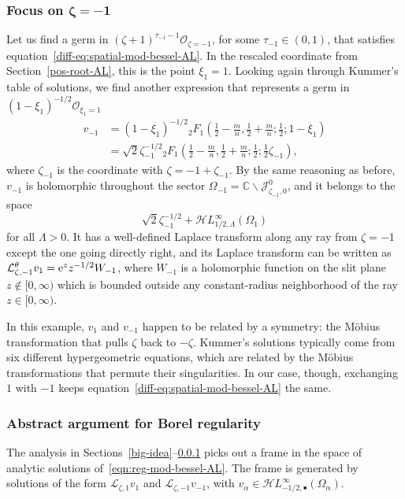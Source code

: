 \documentclass[10pt,a4paper]{amsart}
\newcommand{\singexp}[2]{\mathcal{H}L^\infty_{#1, #2}}
\newcommand{\singexpalg}[1]{\singexp{#1}{\bullet}}
\newcommand{\C}{\mathbb{C}}
\newcommand{\laplace}{\mathcal{L}}
\numberwithin{equation}{section}
\begin{document}
\subsubsection[Focus on zeta = -1]{Focus on $\boldsymbol{\zeta = -1}$}\label{neg-root-AL}
%
Let us find a germ in $(\zeta+1)^{\tau_{-1}-1} \mathcal{O}_{\zeta=-1}$, for some $\tau_{-1} \in (0, 1)$, that satisfies equation~\eqref{diff-eq:spatial-mod-bessel-AL}. In the rescaled coordinate from Section~\ref{pos-root-AL}, this is the point $\xi_1 = 1$. Looking again through Kummer's table of solutions, we find another expression \cite[formula~(15.10.14)]{dlmf} that represents a germ in $(1-\xi_1)^{-1/2} \mathcal{O}_{\xi_1=1}$
\begin{align*}
v_{-1}& = (1-\xi_1)^{-1/2} {}_2F_1\left(\frac{1}{2}-\frac{m}{n}, \frac{1}{2}+\frac{m}{n}; \frac{1}{2}; 1-\xi_1\right)\\
&= \sqrt{2} \zeta_{-1}^{-1/2} {}_2F_1\left(\frac{1}{2}-\frac{m}{n}, \frac{1}{2}+\frac{m}{n}; \frac{1}{2}; \frac{1}{2}\zeta_{-1}\right),
\end{align*}
where $\zeta_{-1}$ is the coordinate with $\zeta = -1 + \zeta_{-1}$. By the same reasoning as before, $v_{-1}$ is holomorphic throughout the sector $\Omega_{-1} = \C \smallsetminus \mathcal{J}^0_{\zeta_{-1}, 0}$, and it belongs to the space
\[ \sqrt{2} \zeta_{-1}^{-1/2} + \singexp{1/2}{\Lambda}(\Omega_1) \]
for all $\Lambda > 0$. It has a well-defined Laplace transform along any ray from $\zeta = -1$ except the one going directly right, and its Laplace transform can be written as
$\laplace^\theta_{\zeta, -1} v_1 ={
\rm e}^z z^{-1/2} W_{-1}$,
where $W_{-1}$ is a holomorphic function on the slit plane $z \notin [0, \infty)$ which is bounded outside any constant-radius neighborhood of the ray $z \in [0, \infty)$.

In this example, $v_1$ and $v_{-1}$ happen to be related by a symmetry: the M\"{o}bius transformation that pulls $\zeta$ back to $-\zeta$. Kummer's solutions typically come from six different hypergeometric equations, which are related by the M\"{o}bius transformations that permute their singularities. In our case, though, exchanging $1$ with $-1$ keeps equation~\eqref{diff-eq:spatial-mod-bessel-AL} the same.
\subsubsection{Abstract argument for Borel regularity}\label{bessel-regularity-AL}
The analysis in Sections~\ref{big-idea}--\ref{neg-root-AL} picks out a frame in the space of analytic solutions of~\eqref{eqn:reg-mod-bessel-AL}. The frame is generated by solutions of the form $\laplace_{\zeta, 1} v_1$ and $\laplace_{\zeta, -1} v_{-1}$, with $v_\alpha \in \singexpalg{-1/2}(\Omega_\alpha)$.
\end{document}
